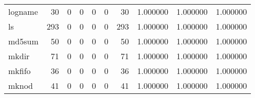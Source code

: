 \begin{tabular}{lrrrrrrrrr}
logname   &                                        30 &                                                  0 &                                                  0 &                                                  0 &                                                  0 &                                                 30 &                                           1.000000 &                               1.000000 &                             1.000000 \\
ls        &                                       293 &                                                  0 &                                                  0 &                                                  0 &                                                  0 &                                                293 &                                           1.000000 &                               1.000000 &                             1.000000 \\
md5sum    &                                        50 &                                                  0 &                                                  0 &                                                  0 &                                                  0 &                                                 50 &                                           1.000000 &                               1.000000 &                             1.000000 \\
mkdir     &                                        71 &                                                  0 &                                                  0 &                                                  0 &                                                  0 &                                                 71 &                                           1.000000 &                               1.000000 &                             1.000000 \\
mkfifo    &                                        36 &                                                  0 &                                                  0 &                                                  0 &                                                  0 &                                                 36 &                                           1.000000 &                               1.000000 &                             1.000000 \\
mknod     &                                        41 &                                                  0 &                                                  0 &                                                  0 &                                                  0 &                                                 41 &                                           1.000000 &                               1.000000 &                             1.000000 \\

\end{tabular}
